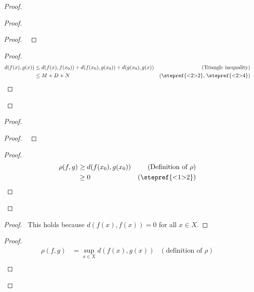 \begin{proof}
  \pf
  \begin{proof}
    \begin{proof}
      \pf\ 
    \end{proof}
    \begin{proof}
      \pf
      \begin{align*}
        d(f(x), g(x)) & \leq d(f(x), f(x_0)) + d(f(x_0), g(x_0)) + d(g(x_0), g(x)) & (\text{Triangle inequality}) \\
        & \leq M + D + N & (\text{\stepref{<2>2}, \stepref{<2>4}})
        \end{align*}
    \end{proof}
  \end{proof}
  \begin{proof}
    \begin{proof}
      \pf\ 
    \end{proof}
    \begin{proof}
      \pf
      \begin{align*}
        \rho(f, g) & \geq d(f(x_0), g(x_0)) & (\text{Definition of } \rho) \\
        & \geq 0 & (\text{\stepref{<1>2}})
      \end{align*}
    \end{proof}
  \end{proof}
  \begin{proof}
    \pf\ This holds because $d(f(x), f(x)) = 0$ for all $x \in X$.
  \end{proof}
  \begin{proof}
    \pf
    \begin{align*}
      \rho(f, g) & = \sup_{x \in X} d(f(x), g(x)) & (\text{definition of } \rho)\\

\end{align*}
\end{proof}
\end{proof}
